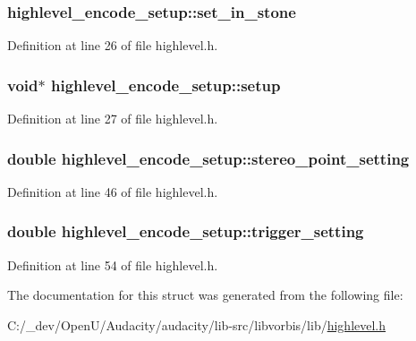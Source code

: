 \subsubsection[{\texorpdfstring{set\+\_\+in\+\_\+stone}{set_in_stone}}]{ highlevel\+\_\+encode\+\_\+setup\+::set\+\_\+in\+\_\+stone}\hypertarget{structhighlevel__encode__setup_a4ed298ef54491509b77efd242ca9ef4b}{}\label{structhighlevel__encode__setup_a4ed298ef54491509b77efd242ca9ef4b}


Definition at line 26 of file highlevel.\+h.

\subsubsection[{\texorpdfstring{setup}{setup}}]{ {\bf void}$\ast$ highlevel\+\_\+encode\+\_\+setup\+::setup}\hypertarget{structhighlevel__encode__setup_a05e4ffe83c4f26fe5305fce8a50d0c42}{}\label{structhighlevel__encode__setup_a05e4ffe83c4f26fe5305fce8a50d0c42}


Definition at line 27 of file highlevel.\+h.

\subsubsection[{\texorpdfstring{stereo\+\_\+point\+\_\+setting}{stereo_point_setting}}]{\setlength{\rightskip}{0pt plus 5cm}double highlevel\+\_\+encode\+\_\+setup\+::stereo\+\_\+point\+\_\+setting}\hypertarget{structhighlevel__encode__setup_a88400017ddc1bfd63762d42adb543238}{}\label{structhighlevel__encode__setup_a88400017ddc1bfd63762d42adb543238}


Definition at line 46 of file highlevel.\+h.

\subsubsection[{\texorpdfstring{trigger\+\_\+setting}{trigger_setting}}]{\setlength{\rightskip}{0pt plus 5cm}double highlevel\+\_\+encode\+\_\+setup\+::trigger\+\_\+setting}\hypertarget{structhighlevel__encode__setup_adfa8e20fbbc4af279909d1a2aab5822f}{}\label{structhighlevel__encode__setup_adfa8e20fbbc4af279909d1a2aab5822f}


Definition at line 54 of file highlevel.\+h.



The documentation for this struct was generated from the following file\+:\begin{DoxyCompactItemize}
\item 
C\+:/\+\_\+dev/\+Open\+U/\+Audacity/audacity/lib-\/src/libvorbis/lib/\hyperlink{highlevel_8h}{highlevel.\+h}\end{DoxyCompactItemize}

